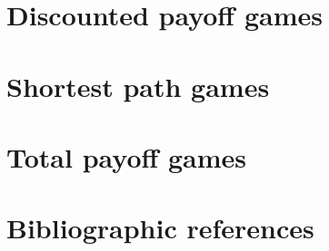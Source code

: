 \section{Discounted payoff games}
\label{4-sec:discounted_payoff}


\section{Shortest path games}
\label{4-sec:shortest_path}


\section{Total payoff games}
\label{4-sec:total_payoff}


\section*{Bibliographic references}
\label{4-sec:references}


